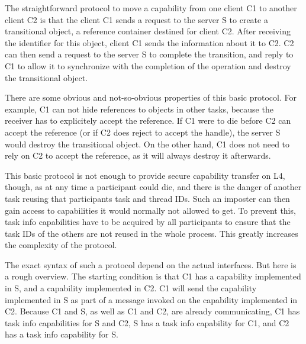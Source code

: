 \documentclass[9pt,a4paper]{extarticle}
\begin{document}
The straightforward protocol to move a capability from one client C1
to another client C2 is that the client C1 sends a request to the
server S to create a transitional object, a reference container
destined for client C2.  After receiving the identifier for this
object, client C1 sends the information about it to C2.  C2 can then
send a request to the server S to complete the transition, and reply
to C1 to allow it to synchronize with the completion of the operation
and destroy the transitional object.
  
There are some obvious and not-so-obvious properties of this basic
protocol.  For example, C1 can not hide references to objects in other
tasks, because the receiver has to explicitely accept the reference.
If C1 were to die before C2 can accept the reference (or if C2 does
reject to accept the handle), the server S would destroy the
transitional object.  On the other hand, C1 does not need to rely on
C2 to accept the reference, as it will always destroy it afterwards.
  
This basic protocol is not enough to provide secure capability
transfer on L4, though, as at any time a participant could die, and
there is the danger of another task reusing that participants task and
thread IDs.  Such an imposter can then gain access to capabilities it
would normally not allowed to get.  To prevent this, task info
capabilities have to be acquired by all participants to ensure that
the task IDs of the others are not reused in the whole process.  This
greatly increases the complexity of the protocol.
  
The exact syntax of such a protocol depend on the actual interfaces.
But here is a rough overview.  The starting condition is that C1 has a
capability implemented in S, and a capability implemented in C2.  C1
will send the capability implemented in S as part of a message invoked
on the capability implemented in C2.  Because C1 and S, as well as C1
and C2, are already communicating, C1 has task info capabilities for S
and C2, S has a task info capability for C1, and C2 has a task info
capability for S.
\end{document}
